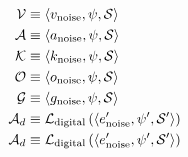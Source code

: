 \begin{align}
    \mthScientificV  &\equiv \mthCoupledState{\mthVNoise,  \mthVirtualConviction, \mthState} \\
    \mthScientificA  &\equiv \mthCoupledState{\mthANoise,  \mthVirtualConviction, \mthState} \\
    \mthScientificK  &\equiv \mthCoupledState{\mthKNoise,  \mthVirtualConviction, \mthState} \\
    \mthScientificO  &\equiv \mthCoupledState{\mthONoise,  \mthVirtualConviction, \mthState} \\
    \mthScientificG  &\equiv \mthCoupledState{\mthGNoise,  \mthVirtualConviction, \mthState} \\
    \mthScientificAd &\equiv \mthLangTranslation{\mthCoupledState{\mthEnvNoise', \mthVirtualConviction', \mthState'} } \\
    \mthScientificAd &\equiv \mthLangTranslation{\mthCoupledState{\mthEnvNoise', \mthVirtualConviction', \mthState'} }
\end{align}


